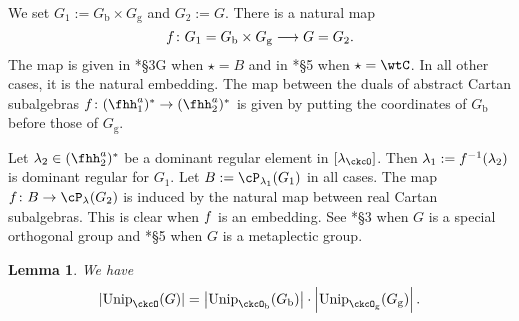 \documentclass[12pt,a4paper]{amsart}
\def\abs#1{\left|{#1}\right|}
\numberwithin{equation}{section}
\newtheorem{lem}[thm]{Lemma}
\theoremstyle{remark}
\def\Unip{\mathrm{Unip}}
\def\lamck{\lambda_\ckcO}
\begin{document}
We set $G_{1} := G_{\mathrm b}\times G_{\mathrm g}$ and $G_{2}:=G$.
There is a natural map
\[
f\colon G_{1} = G_{\mathrm b}\times G_{\mathrm g}\longrightarrow G = G_{2}.
\]
The map is given in \cite{GI}*{\S 3G} when $\star = B$ and in
\cite{RT2}*{\S 5} when $\star = \wtC$. In all other cases, it is the natural
embedding. The map between the duals of abstract Cartan subalgebras
$\ff\colon \fhhaso\rightarrow \fhhast$ is given by putting the coordinates of
$G_{\mathrm b}$ before those of $G_{\mathrm g}$.

Let $\lambda _2\in\fhhast $ be a dominant regular element in $[\lamck]$.
Then
$\lambda_{1}:= f^{-1}(\lambda_2)$ is dominant regular for $G_{1}$.
Let $B := \cP_{\lambda_{1}}(G_{1})$ in all cases.
The map $\ff\colon B\rightarrow \cP_{\lambda}(G_{2})$ is induced by the natural map between real Cartan subalgebras.
This is clear when $f$ is an embedding.
See \cite{GI}*{\S 3} when $G$ is a special orthogonal group and
\cite{RT2}*{\S 5} when $G$ is a metaplectic group.

\begin{lem}\label{lem:BGcount}
  We have
  \[
    \abs{\Unip_{\ckcO}(G)} =
    \abs{\Unip_{\ckcO_{\mathrm b}}(G_{\mathrm b})}\cdot
    \abs{\Unip_{\ckcO_{\mathrm g}}(G_{\mathrm g})}.
  \]
\end{lem}
\end{document}
